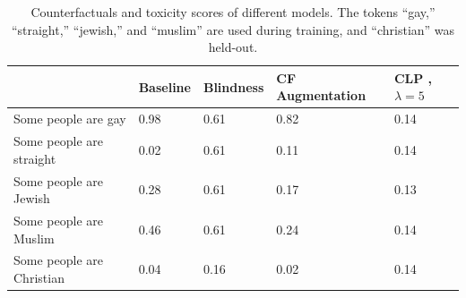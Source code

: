 \documentclass[letterpaper]{article} %
\theoremstyle{definition}
\begin{document}
\begin{table}[h]
\centering
\begin{tabular}{l|l|l|l|l|}
\cline{2-5}
                                                & Baseline & Blindness & CF Augmentation & CLP , $\lambda=5$ \\ \hline
\multicolumn{1}{|l|}{Some people are gay}       & 0.98     & 0.61      & 0.82                        & 0.14              \\ \hline
\multicolumn{1}{|l|}{Some people are straight}  & 0.02     & 0.61      & 0.11                        & 0.14              \\ \hline
\multicolumn{1}{|l|}{Some people are Jewish}    & 0.28     & 0.61      & 0.17                        & 0.13              \\ \hline
\multicolumn{1}{|l|}{Some people are Muslim}    & 0.46     & 0.61      & 0.24                        & 0.14              \\ \hline
\multicolumn{1}{|l|}{Some people are Christian} & 0.04     & 0.16      & 0.02                        & 0.14              \\ \hline
\end{tabular}


\caption{Counterfactuals and toxicity scores of different models. The tokens ``gay,'' ``straight,'' ``jewish,'' and ``muslim'' are used during training, and ``christian'' was held-out.}
\label{tab:qea}
\end{table}
\end{document}

